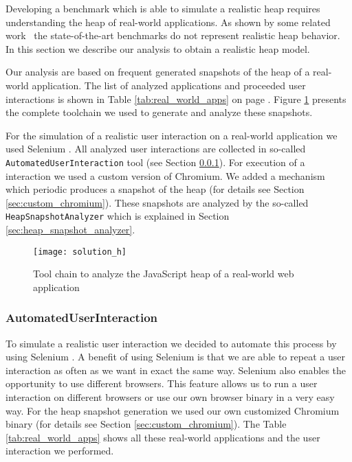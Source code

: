 Developing a benchmark which is able to simulate a realistic \JS heap requires understanding the heap of real-world applications. As shown by some related work~\cite{JSMeter2009,JSMeter2010,Richards2011} the state-of-the-art benchmarks do not represent realistic heap behavior. In this section we describe our analysis to obtain a realistic heap model.

Our analysis are based on frequent generated snapshots of the \JS heap of a real-world application. The list of analyzed applications and proceeded user interactions is shown in Table \ref{tab:real_world_apps} on page \pageref{tab:real_world_apps}.
Figure \ref{fig:heap_structure_analysis} presents the complete toolchain we used to generate and analyze these snapshots. 

For the simulation of a realistic user interaction on a real-world application we used Selenium \cite{Selenium}. All analyzed user interactions are collected in so-called \texttt{AutomatedUserInteraction} tool (see Section \ref{sec:automated_user_interaction}). For execution of a interaction we used a custom version of Chromium. We added a mechanism which periodic produces a snapshot of the \JS heap (for details see Section \ref{sec:custom_chromium}). These snapshots are analyzed by the so-called \texttt{HeapSnapshotAnalyzer} which is explained in Section \ref{sec:heap_snapshot_analyzer}.

\begin{figure}
	\centering
	\texttt{[image: solution\_h]}
	\caption{Tool chain to analyze the JavaScript heap of a real-world web application}
	\label{fig:heap_structure_analysis}
\end{figure}


	
\subsubsection{AutomatedUserInteraction} \label{sec:automated_user_interaction}
To simulate a realistic user interaction we decided to automate this process by using Selenium \cite{Selenium}. A benefit of using Selenium is that we are able to repeat a user interaction as often as we want in exact the same way. Selenium also enables the opportunity to use different browsers. This feature allows us to run a user interaction on different browsers or use our own browser binary in a very easy way. For the heap snapshot generation we used our own customized Chromium binary (for details see Section \ref{sec:custom_chromium}). The Table \ref{tab:real_world_apps} shows all these real-world applications and the user interaction we performed. 

